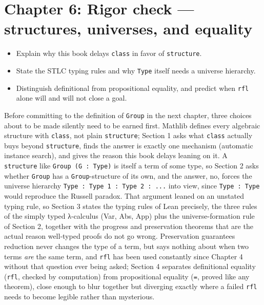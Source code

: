 \chapter{Chapter 6: Rigor check --- structures, universes, and equality}\label{sec:06-rigor-check:00-index:1}

\begin{learningobjectives}
\begin{itemize}
\tightlist
\item
  Explain why this book delays \texttt{class} in favor of \texttt{structure}.
\item
  State the STLC typing rules and why \texttt{Type} itself needs a universe hierarchy.
\item
  Distinguish definitional from propositional equality, and predict when \texttt{rfl} alone will and will not close a goal.
\end{itemize}
\end{learningobjectives}


Before committing to the definition of \texttt{Group} in the next chapter, three choices about to be made silently need to be earned first. Mathlib defines every algebraic structure with \texttt{class}, not plain \texttt{structure}; Section 1 asks what \texttt{class} actually buys beyond \texttt{structure}, finds the answer is exactly one mechanism (automatic instance search), and gives the reason this book delays leaning on it. A \texttt{structure} like \texttt{Group (G : Type)} is itself a term of some type, so Section 2 asks whether \texttt{Group} has a \texttt{Group}-structure of its own, and the answer, no, forces the universe hierarchy \texttt{Type : Type 1 : Type 2 : ...} into view, since \texttt{Type : Type} would reproduce the Russell paradox. That argument leaned on an unstated typing rule, so Section 3 states the typing rules of Lean precisely, the three rules of the simply typed λ-calculus (Var, Abs, App) plus the universe-formation rule of Section 2, together with the progress and preservation theorems that are the actual reason well-typed proofs do not go wrong. Preservation guarantees reduction never changes the type of a term, but says nothing about when two terms \emph{are} the same term, and \texttt{rfl} has been used constantly since Chapter 4 without that question ever being asked; Section 4 separates definitional equality (\texttt{rfl}, checked by computation) from propositional equality (\texttt{=}, proved like any theorem), close enough to blur together but diverging exactly where a failed \texttt{rfl} needs to become legible rather than mysterious.

